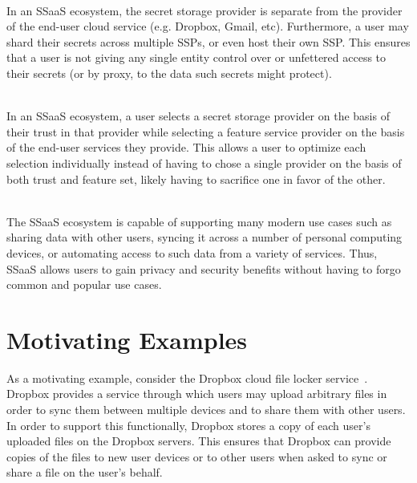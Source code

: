 \begin{packed_desc}
\item[No Single Trusted Third Party] \hfill \\ In an SSaaS ecosystem,
  the secret storage provider is separate from the provider of the
  end-user cloud service (e.g. Dropbox, Gmail, etc). Furthermore, a
  user may shard their secrets across multiple SSPs, or even host
  their own SSP. This ensures that a user is not giving any single
  entity control over or unfettered access to their secrets (or by
  proxy, to the data such secrets might protect).
\item[Separation of Duties] \hfill \\ In an SSaaS ecosystem, a user
  selects a secret storage provider on the basis of their trust in
  that provider while selecting a feature service provider on the
  basis of the end-user services they provide. This allows a user to
  optimize each selection individually instead of having to chose a
  single provider on the basis of both trust and feature set, likely
  having to sacrifice one in favor of the other.
\item[Support for Existing Use Cases] \hfill \\ The SSaaS ecosystem is
  capable of supporting many modern use cases such as sharing data
  with other users, syncing it across a number of personal computing
  devices, or automating access to such data from a variety of
  services. Thus, SSaaS allows users to gain privacy and security
  benefits without having to forgo common and popular use cases.
\end{packed_desc}

\section{Motivating Examples}
\label{chap:intro:example}

As a motivating example, consider the Dropbox cloud file locker
service~\cite{dropbox}. Dropbox provides a service through which users
may upload arbitrary files in order to sync them between multiple
devices and to share them with other users. In order to support this
functionally, Dropbox stores a copy of each user's uploaded files on
the Dropbox servers. This ensures that Dropbox can provide copies of
the files to new user devices or to other users when asked to sync or
share a file on the user's behalf.

